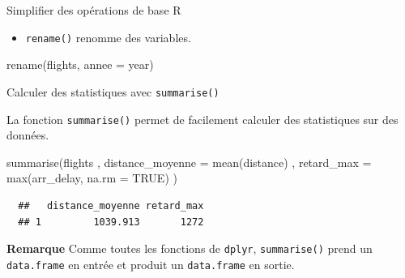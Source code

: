 \documentclass[12pt,ignorenonframetext,handout,]{beamer}
\newenvironment{Shaded}{}{}
\newcommand{\DataTypeTok}[1]{#1}
\newcommand{\KeywordTok}[1]{\textcolor[rgb]{0.00,0.00,1.00}{#1}}
\newcommand{\NormalTok}[1]{#1}
\newcommand{\OtherTok}[1]{\textcolor[rgb]{1.00,0.25,0.00}{#1}}
\providecommand{\tightlist}{%
  \setlength{\itemsep}{0pt}\setlength{\parskip}{0pt}}
\renewenvironment{Shaded}{\begin{snugshade}}{\end{snugshade}}
\newcommand{\intertitre}[1]{\textcolor{redInsee}{\textbf{#1}}}
\begin{document}
\begin{frame}[fragile]{Simplifier des opérations de base R}
\pause \vspace{-3mm}

\begin{itemize}
\tightlist
\item
  \texttt{rename()} renomme des variables.
\end{itemize}

\vspace{-3mm}

\begin{Shaded}
\begin{Highlighting}[]
\KeywordTok{rename}\NormalTok{(flights, }\DataTypeTok{annee =}\NormalTok{ year)}
\end{Highlighting}
\end{Shaded}

\end{frame}

\begin{frame}[fragile]{Calculer des statistiques avec
\texttt{summarise()}}
\protect\hypertarget{calculer-des-statistiques-avec-summarise}{}

La fonction \texttt{summarise()} permet de facilement calculer des
statistiques sur des données.

\pause

\begin{Shaded}
\begin{Highlighting}[]
\KeywordTok{summarise}\NormalTok{(flights}
\NormalTok{  , }\DataTypeTok{distance_moyenne =} \KeywordTok{mean}\NormalTok{(distance)}
\NormalTok{  , }\DataTypeTok{retard_max =} \KeywordTok{max}\NormalTok{(arr_delay, }\DataTypeTok{na.rm =} \OtherTok{TRUE}\NormalTok{)}
\NormalTok{)}
\end{Highlighting}
\end{Shaded}

\begin{verbatim}
  ##   distance_moyenne retard_max
  ## 1         1039.913       1272
\end{verbatim}

\pause

\intertitre{Remarque} Comme toutes les fonctions de \texttt{dplyr},
\texttt{summarise()} prend un \texttt{data.frame} en entrée et produit
un \texttt{data.frame} en sortie.

\end{frame}
\end{document}

